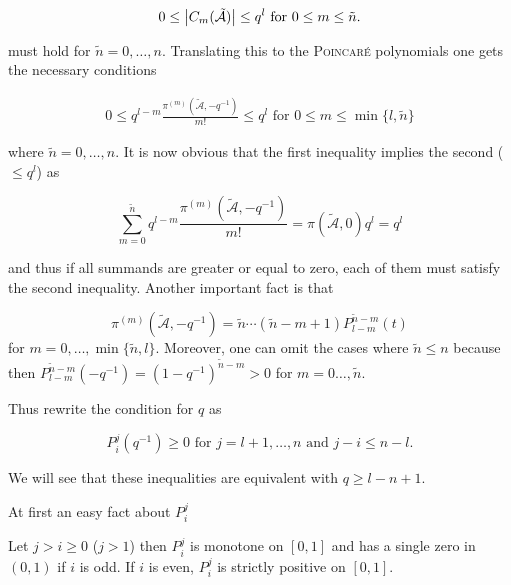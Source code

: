 \documentclass[a4paper]{article}
\begin{document}
\begin{equation}
  0 \leq \left|C_m(\tilde{\mathcal{A}})\right| \leq q^l \text{ for } 0\leq m\leq\tilde{n}\text{.}
\end{equation}

must hold for $\tilde{n}=0,\ldots,n$. Translating this to the \textsc{Poincaré} polynomials one gets the necessary conditions

\begin{align}
  0\leq q^{l-m}\frac{\pi^{(m)}(\tilde{\mathcal{A}},-q^{-1})}{m!} \leq q^l \text{ for } 0\leq m\leq\min\{l,\tilde{n}\}
\end{align}

where $\tilde{n}=0,\ldots,n$. It is now obvious that the first inequality implies the second ($\leq q^l$) as

\begin{equation}
  \sum_{m=0}^{\tilde{n}}{q^{l-m}\frac{\pi^{(m)}(\tilde{\mathcal{A}},-q^{-1})}{m!}}=\pi(\tilde{\mathcal{A}},0)q^l=q^l
\end{equation}

and thus if all summands are greater or equal to zero, each of them must satisfy the second inequality. Another important fact is that

\begin{equation}
  \pi^{(m)}(\tilde{\mathcal{A}},-q^{-1})=\tilde{n}\cdots(\tilde{n}-m+1)P_{l-m}^{\tilde{n}-m}(t)
\end{equation}
for $m=0,\ldots,\min\{\tilde{n},l\}$. Moreover, one can omit the cases where $\tilde{n}\leq n$ because then $P_{l-m}^{\tilde{n}-m}(-q^{-1})=(1-q^{-1})^{\tilde{n}-m}>0$ for $m=0\ldots,\tilde{n}$.

Thus rewrite the condition for $q$ as

\begin{equation}
  P_i^j(q^{-1})\geq 0 \text{ for } j=l+1,\ldots,n \text{ and } j-i\leq n-l\text{.}
\end{equation}

We will see that these inequalities are equivalent with $q\geq l-n+1$.

At first an easy fact about $P_i^j$

\begin{lemma}
  Let $j>i\geq 0$ ($j>1$) then $P_i^j$ is monotone on $[0,1]$ and has a single zero in $(0,1)$ if $i$ is odd.
  If $i$ is even, $P_i^j$ is strictly positive on $[0,1]$.
\end{lemma}
\end{document}
